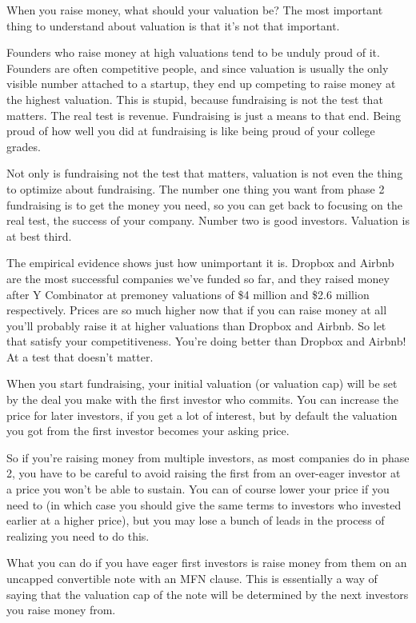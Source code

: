 When you raise money, what should your valuation be? The most important
thing to understand about valuation is that it's not that important.

Founders who raise money at high valuations tend to be unduly proud of
it. Founders are often competitive people, and since valuation is
usually the only visible number attached to a startup, they end up
competing to raise money at the highest valuation. This is stupid,
because fundraising is not the test that matters. The real test is
revenue. Fundraising is just a means to that end. Being proud of how
well you did at fundraising is like being proud of your college grades.

Not only is fundraising not the test that matters, valuation is not even
the thing to optimize about fundraising. The number one thing you want
from phase 2 fundraising is to get the money you need, so you can get
back to focusing on the real test, the success of your company. Number
two is good investors. Valuation is at best third.

The empirical evidence shows just how unimportant it is. Dropbox and
Airbnb are the most successful companies we've funded so far, and they
raised money after Y Combinator at premoney valuations of \$4 million
and \$2.6 million respectively. Prices are so much higher now that if
you can raise money at all you'll probably raise it at higher valuations
than Dropbox and Airbnb. So let that satisfy your competitiveness.
You're doing better than Dropbox and Airbnb! At a test that doesn't
matter.

When you start fundraising, your initial valuation (or valuation cap)
will be set by the deal you make with the first investor who commits.
You can increase the price for later investors, if you get a lot of
interest, but by default the valuation you got from the first investor
becomes your asking price.

So if you're raising money from multiple investors, as most companies do
in phase 2, you have to be careful to avoid raising the first from an
over-eager investor at a price you won't be able to sustain. You can of
course lower your price if you need to (in which case you should give
the same terms to investors who invested earlier at a higher price), but
you may lose a bunch of leads in the process of realizing you need to do
this.

What you can do if you have eager first investors is raise money from
them on an uncapped convertible note with an MFN clause. This is
essentially a way of saying that the valuation cap of the note will be
determined by the next investors you raise money from.

